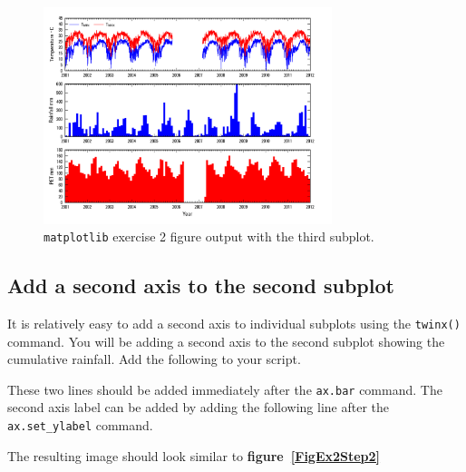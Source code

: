 \documentclass[12pt]{article}
\begin{document}
\begin{figure}
	\centering
  	\includegraphics[width=0.75\textwidth]{figures/MeterologicBar_step1.png}
 	\caption{\texttt{matplotlib} exercise 2 figure output with the third subplot.}
	\label{FigEx2Step1}
\end{figure}

\subsection{Add a second axis to the second subplot}
It is relatively easy to add a second axis to individual subplots using the \texttt{twinx()} command. You will be adding a second axis to the second subplot showing the cumulative rainfall. Add the following to your script.

\begin{center}
	
\end{center}

These two lines should be added immediately after the \texttt{ax.bar} command. The second axis label can be added by adding the following line after the \texttt{ax.set\_ylabel} command.

\begin{center}
	
\end{center}

The resulting image should look similar to \textbf{figure~\ref{FigEx2Step2}}
\end{document}

